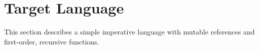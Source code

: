 \section{Target Language}
\label{sec:prelim}
This section describes a simple imperative language with mutable references and first-order, recursive functions.


